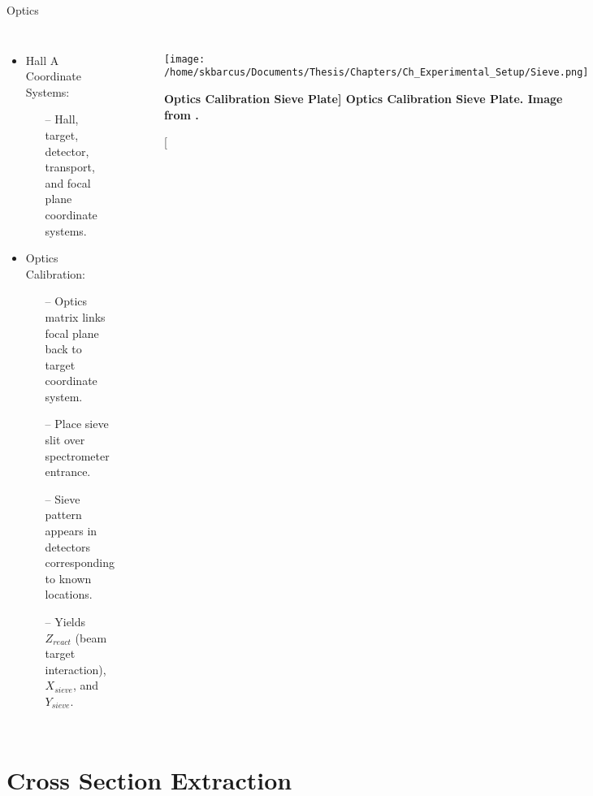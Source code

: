 \documentclass[10pt]{beamer}
\begin{document}
\begin{frame}[fragile]{Optics}

	\begin{columns}[T,onlytextwidth]  
	\begin{itemize}
		\item \alert{Hall A Coordinate Systems}:
			\begin{itemize}
				\item[--] Hall, target, detector, transport, and focal plane coordinate systems.
			\end{itemize}
		\pause
		\item \alert{Optics Calibration}:
			\begin{itemize}
				\item[--] \alert{Optics matrix links focal plane back to target coordinate system}.
				\item[--] Place sieve slit over spectrometer entrance.
				\item[--] Sieve pattern appears in detectors corresponding to known locations.
				\item[--] Yields \alert{$Z_{react}$} (beam target interaction), \alert{$X_{sieve}$}, and \alert{$Y_{sieve}$}. 
			\end{itemize}
	\end{itemize}
	
	\begin{figure}[!ht]
	\begin{center}
	\texttt{[image: /home/skbarcus/Documents/Thesis/Chapters/Ch\_Experimental\_Setup/Sieve.png]}
	\end{center}
	\caption[\bf{Optics Calibration Sieve Plate}]{
	{\bf{Optics Calibration Sieve Plate.}} Image from \cite{Thesis:Ye}.}
	\label{fig:halla_top}
	\end{figure}	
	\end{columns}
	
\end{frame}

\section{Cross Section Extraction}
\end{document}
